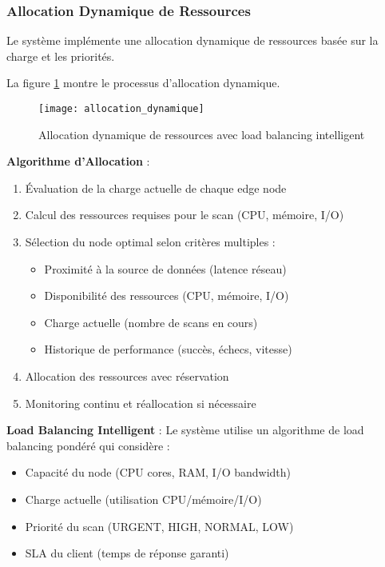 \subsubsection{Allocation Dynamique de Ressources}

Le système implémente une allocation dynamique de ressources basée sur la charge et les priorités.

La figure \ref{fig:allocation_dynamique} montre le processus d'allocation dynamique.

\begin{figure}[htpb]
\centering
\texttt{[image: allocation\_dynamique]}
\caption{Allocation dynamique de ressources avec load balancing intelligent}
\label{fig:allocation_dynamique}
\end{figure}

\textbf{Algorithme d'Allocation} :
\begin{enumerate}
    \item Évaluation de la charge actuelle de chaque edge node
    \item Calcul des ressources requises pour le scan (CPU, mémoire, I/O)
    \item Sélection du node optimal selon critères multiples :
    \begin{itemize}
        \item Proximité à la source de données (latence réseau)
        \item Disponibilité des ressources (CPU, mémoire, I/O)
        \item Charge actuelle (nombre de scans en cours)
        \item Historique de performance (succès, échecs, vitesse)
    \end{itemize}
    \item Allocation des ressources avec réservation
    \item Monitoring continu et réallocation si nécessaire
\end{enumerate}

\textbf{Load Balancing Intelligent} : Le système utilise un algorithme de load balancing pondéré qui considère :
\begin{itemize}
    \item Capacité du node (CPU cores, RAM, I/O bandwidth)
    \item Charge actuelle (utilisation CPU/mémoire/I/O)
    \item Priorité du scan (URGENT, HIGH, NORMAL, LOW)
    \item SLA du client (temps de réponse garanti)
\end{itemize}


